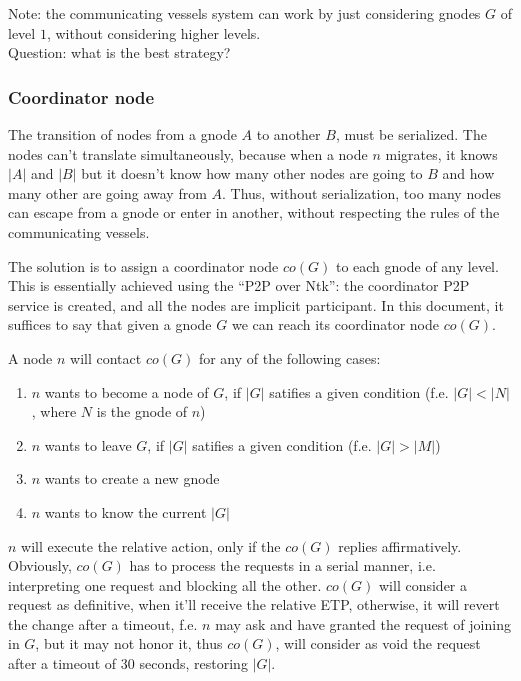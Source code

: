 \documentclass[a4paper]{article}
\begin{document}
Note: the communicating vessels system can work by just considering
gnodes $G$ of level $1$, without considering higher levels.\\
\label{questiongn}
Question: what is the best strategy?

\subsubsection{Coordinator node}
The transition of nodes from a gnode $A$ to another $B$, must be serialized.
The nodes can't translate simultaneously, because when a node $n$ migrates, it knows
$|A|$ and $|B|$ but it doesn't know how many other nodes are going to $B$ and
how many other are going away from $A$. Thus, without serialization, too many
nodes can escape from a gnode or enter in another, without respecting the
rules of the communicating vessels.

The solution is to assign a coordinator node $co(G)$ to each gnode of any
level. This is essentially achieved using the ``P2P over Ntk''\cite{ntkp2p}:
the coordinator P2P service is created, and all the nodes are implicit
participant. In this document, it suffices to say that given a gnode $G$ we
can reach its coordinator node $co(G)$.

A node $n$ will contact $co(G)$ for any of the following cases:
\begin{enumerate}
	\item $n$ wants to become a node of $G$,
		if $|G|$ satifies a given condition (f.e. $|G| < |N|$, where $N$ is the gnode of $n$)
	\item $n$ wants to leave $G$,
		if $|G|$ satifies a given condition (f.e. $|G| > |M|$)
	\item $n$ wants to create a new gnode
	\item $n$ wants to know the current $|G|$
\end{enumerate}
$n$ will execute the relative action, only if the $co(G)$ replies
affirmatively. Obviously, $co(G)$ has to process the requests in a serial
manner, i.e. interpreting one request and blocking all the other. $co(G)$ will
consider a request as definitive, when it'll receive the relative ETP,
otherwise, it will revert the change after a timeout, f.e. $n$ may ask and
have granted the request of joining in $G$, but it may not honor it, thus
$co(G)$, will consider as void the request after a timeout of 30 seconds,
restoring $|G|$.\\
\end{document}
